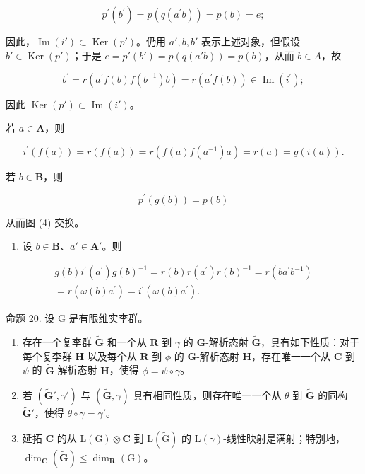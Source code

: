 \[
p ^ {\prime} (b ^ {\prime}) = p (q (a ^ {\prime} b)) = p (b) = e;
\]

因此，\(\operatorname{Im}(i') \subset \operatorname{Ker}(p')\)。仍用 \(a', b, b'\) 表示上述对象，但假设 \(b' \in \operatorname{Ker}(p')\)；于是 \(e = p'(b') = p(q(a'b)) = p(b)\)，从而 \(b \in A\)，故

\[
b ^ {\prime} = r (a ^ {\prime} f (b) f (b ^ {- 1}) b) = r (a ^ {\prime} f (b)) \in \operatorname{Im} (i ^ {\prime});
\]

因此 \(\operatorname{Ker}(p') \subset \operatorname{Im}(i')\)。

若 \(a\in \mathbf{A}\)，则

\[
i ^ {\prime} (f (a)) = r (f (a)) = r (f (a) f \left(a ^ {- 1}\right) a) = r (a) = g (i (a)).
\]

若 \(b\in \mathbf{B}\)，则

\[
p ^ {\prime} (g (b)) = p (b)
\]

从而图 (4) 交换。

\begin{enumerate}
\def\labelenumi{(\roman{enumi})}
\setcounter{enumi}{3}
\tightlist
\item
  设 \(b \in \mathbf{B}\)、\(a' \in \mathbf{A}'\)。则
\end{enumerate}

\[
\begin{array}{r} g (b) i ^ {\prime} (a ^ {\prime}) g (b) ^ {- 1} = r (b) r (a ^ {\prime}) r (b) ^ {- 1} = r (b a ^ {\prime} b ^ {- 1}) \\ = r (\omega (b) a ^ {\prime}) = i ^ {\prime} (\omega (b) a ^ {\prime}). \end{array}
\]

命题 20. 设 G 是有限维实李群。

\begin{enumerate}
\def\labelenumi{(\roman{enumi})}
\item
  存在一个复李群 \(\tilde{\mathbf{G}}\) 和一个从 \(\mathbf{R}\) 到 \(\gamma\) 的 \(\mathbf{G}\)-解析态射 \(\tilde{\mathbf{G}}\)，具有如下性质：对于每个复李群 \(\mathbf{H}\) 以及每个从 \(\mathbf{R}\) 到 \(\phi\) 的 \(\mathbf{G}\)-解析态射 \(\mathbf{H}\)，存在唯一一个从 \(\mathbf{C}\) 到 \(\psi\) 的 \(\tilde{\mathbf{G}}\)-解析态射 \(\mathbf{H}\)，使得 \(\phi = \psi \circ \gamma\)。
\item
  若 \((\tilde{\mathbf{G}}', \gamma')\) 与 \((\tilde{\mathbf{G}}, \gamma)\) 具有相同性质，则存在唯一一个从 \(\theta\) 到 \(\tilde{\mathbf{G}}\) 的同构 \(\tilde{\mathbf{G}}'\)，使得 \(\theta \circ \gamma = \gamma'\)。
\item
  延拓 \(\mathbf{C}\) 的从 \(\mathrm{L}(\mathrm{G}) \otimes \mathbf{C}\) 到 \(\mathrm{L}(\tilde{\mathrm{G}})\) 的 \(\mathrm{L}(\gamma)\)-线性映射是满射；特别地，\(\dim_{\mathbf{C}}(\tilde{\mathbf{G}}) \leqslant \dim_{\mathbf{R}}(\mathrm{G})\)。
\end{enumerate}

